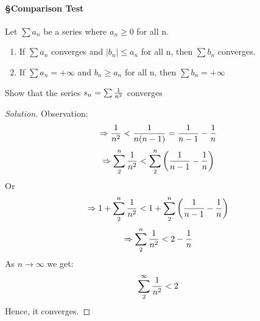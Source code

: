 \documentclass{notes}
\begin{document}
\paragraph{\S Comparison Test}
Let $\sum a_n$ be a series where $a_n \geq  0$  for all n.
\begin{enumerate}
	\item
	If $\sum a_n$ converges and $|b_n|\leq a_n $ for all n, then $\sum b_n$ converges.
	\item
	If $\sum a_n = + \infty$ and $b_n \geq a_n$ for all n, then $\sum b_n = + \infty$
\end{enumerate}
\begin{problem}
	Show that the series $s_n = \sum {1 \over n^2}$ converges
	\label{1 by n^2}
\end{problem}
\begin{proof}[Solution]
	Observation:$$
	\Rightarrow {1 \over n^2}  < {1 \over n(n-1)} = {1 \over n-1} - {1 \over n}
	$$
	$$
	\Rightarrow \sum_{2}^{n} {1 \over n^2} < \sum_{2}^{n}	\left({1 \over n-1} - {1 \over n}\right)
	$$
	Or  
	$$
	\Rightarrow 1+\sum_{2}^{n} {1 \over n^2} < 1+\sum_{2}^{n}	\left({1 \over n-1} - {1 \over n}\right)
	$$
	$$
	\Rightarrow \sum_{2}^{n} {1 \over n^2} <2 - \frac{1}{n}
	$$
	As $n \to \infty$ we get:
	$$\sum_{2}^{\infty} {1 \over n^2} < 2 $$
	Hence, it converges.
\end{proof}
\end{document}
